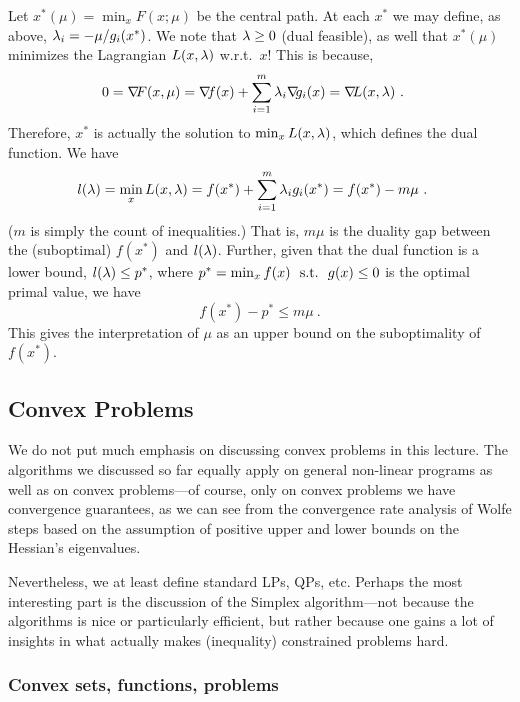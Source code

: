 Let $x^*(\mu) = \min_x F(x;\mu)$ be the central path. At each $x^*$
we may define, as above, $\lambda_i = -\mu/g_i(x^*)$. We note that $\lambda\ge0$
(dual feasible), as well that $x^*(\mu)$ minimizes the Lagrangian
$L(x,\lambda)$ w.r.t.\ $x$! This is because,
\begin{align}
0
&= \na F(x,\mu) 
 = \na f(x) + \sum_{i=1}^m \l_i \na g_i(x)
 = \na L(x,\l) ~.
\end{align}
Therefore, $x^*$ is actually the solution to $\min_x L(x,\lambda)$, which
defines the dual function. We have
\begin{align}
l(\lambda)
&= \min_x L(x,\lambda)
 = f(x^*) + \sum_{i=1}^m \lambda_i g_i(x^*)
 = f(x^*) - m \mu ~.
\end{align}
($m$ is simply the count of inequalities.)
That is, $m \mu$ is the duality gap between the (suboptimal)  $f(x^*)$ and $l(\lambda)$. Further, given that the
dual function is a lower bound, $l(\lambda) \le p^*$, where $p^*=\min_x f(x)
~~\text{s.t.}~~ g(x)\le 0$ is the optimal primal value, we have
\begin{equation}
f(x^*) - p^* \le m \mu ~.
\end{equation}
This gives the interpretation of $\mu$ as an upper bound on the suboptimality of $f(x^*)$.








\subsection{Convex Problems}

We do not put much emphasis on discussing convex problems in this
lecture. The algorithms we discussed so far equally apply on general
non-linear programs as well as on convex problems---of course, only on
convex problems we have convergence guarantees, as we
can see from the convergence rate analysis of Wolfe steps based on the
assumption of positive upper and lower bounds on the Hessian's
eigenvalues.

Nevertheless, we at least define standard LPs, QPs, etc. Perhaps the
most interesting part is the discussion of the Simplex algorithm---not
because the algorithms is nice or particularly efficient, but rather
because one gains a lot of insights in what actually makes
(inequality) constrained problems hard.

\subsubsection{Convex sets, functions, problems}

